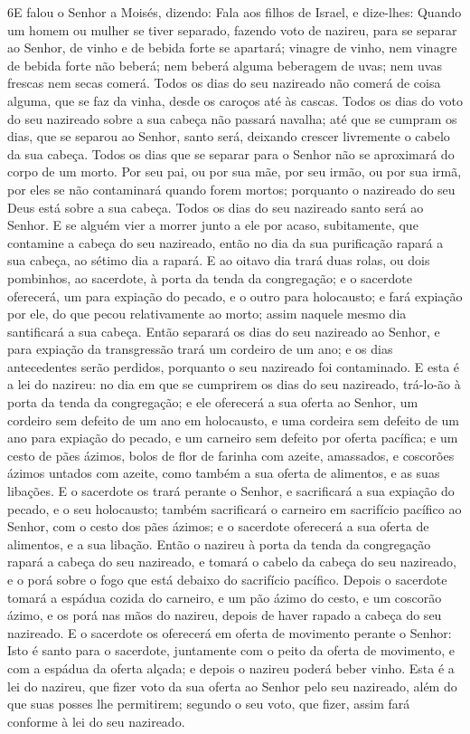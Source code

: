 \medskip

\lettrine{6} E falou o Senhor a Moisés, dizendo: Fala aos
filhos de Israel, e dize-lhes: Quando um homem ou mulher se tiver
separado, fazendo voto de nazireu, para se separar ao Senhor, de
vinho e de bebida forte se apartará; vinagre de vinho, nem vinagre
de bebida forte não beberá; nem beberá alguma beberagem de uvas; nem
uvas frescas nem secas comerá. Todos os dias do seu nazireado
não comerá de coisa alguma, que se faz da vinha, desde os caroços
até às cascas. Todos os dias do voto do seu nazireado sobre a
sua cabeça não passará navalha; até que se cumpram os dias, que se
separou ao Senhor, santo será, deixando crescer livremente o cabelo
da sua cabeça. Todos os dias que se separar para o Senhor não se
aproximará do corpo de um morto. Por seu pai, ou por sua mãe,
por seu irmão, ou por sua irmã, por eles se não contaminará quando
forem mortos; porquanto o nazireado do seu Deus está sobre a sua
cabeça. Todos os dias do seu nazireado santo será ao Senhor.
E se alguém vier a morrer junto a ele por acaso, subitamente,
que contamine a cabeça do seu nazireado, então no dia da sua
purificação rapará a sua cabeça, ao sétimo dia a rapará. E ao
oitavo dia trará duas rolas, ou dois pombinhos, ao sacerdote, à
porta da tenda da congregação; e o sacerdote oferecerá, um
para expiação do pecado, e o outro para holocausto; e fará expiação
por ele, do que pecou relativamente ao morto; assim naquele mesmo
dia santificará a sua cabeça. Então separará os dias do seu
nazireado ao Senhor, e para expiação da transgressão trará um
cordeiro de um ano; e os dias antecedentes serão perdidos, porquanto
o seu nazireado foi contaminado. E esta é a lei do nazireu:
no dia em que se cumprirem os dias do seu nazireado, trá-lo-ão à
porta da tenda da congregação; e ele oferecerá a sua oferta
ao Senhor, um cordeiro sem defeito de um ano em holocausto, e uma
cordeira sem defeito de um ano para expiação do pecado, e um
carneiro sem defeito por oferta pacífica; e um cesto de pães
ázimos, bolos de flor de farinha com azeite, amassados, e coscorões
ázimos untados com azeite, como também a sua oferta de alimentos, e
as suas libações. E o sacerdote os trará perante o Senhor, e
sacrificará a sua expiação do pecado, e o seu holocausto;
também sacrificará o carneiro em sacrifício pacífico ao
Senhor, com o cesto dos pães ázimos; e o sacerdote oferecerá a sua
oferta de alimentos, e a sua libação. Então o nazireu à porta
da tenda da congregação rapará a cabeça do seu nazireado, e tomará o
cabelo da cabeça do seu nazireado, e o porá sobre o fogo que está
debaixo do sacrifício pacífico. Depois o sacerdote tomará a
espádua cozida do carneiro, e um pão ázimo do cesto, e um coscorão
ázimo, e os porá nas mãos do nazireu, depois de haver rapado a
cabeça do seu nazireado. E o sacerdote os oferecerá em oferta
de movimento perante o Senhor: Isto é santo para o sacerdote,
juntamente com o peito da oferta de movimento, e com a espádua da
oferta alçada; e depois o nazireu poderá beber vinho. Esta é
a lei do nazireu, que fizer voto da sua oferta ao Senhor pelo seu
nazireado, além do que suas posses lhe permitirem; segundo o seu
voto, que fizer, assim fará conforme à lei do seu nazireado.

